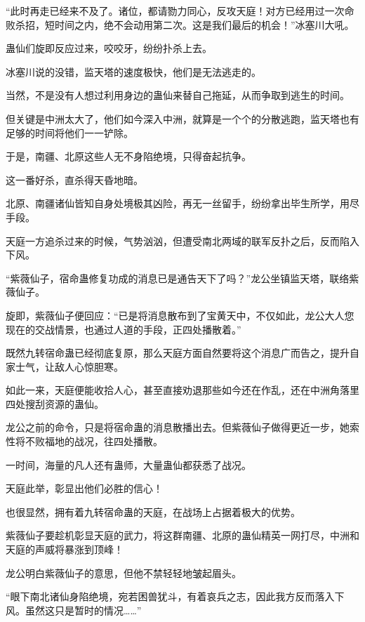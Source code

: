
\begin{this_body}

“此时再走已经来不及了。诸位，都请勠力同心，反攻天庭！对方已经用过一次命败杀招，短时间之内，绝不会动用第二次。这是我们最后的机会！”冰塞川大吼。

蛊仙们旋即反应过来，咬咬牙，纷纷扑杀上去。

冰塞川说的没错，监天塔的速度极快，他们是无法逃走的。

当然，不是没有人想过利用身边的蛊仙来替自己拖延，从而争取到逃生的时间。

但关键是中洲太大了，他们如今深入中洲，就算是一个个的分散逃跑，监天塔也有足够的时间将他们一一铲除。

于是，南疆、北原这些人无不身陷绝境，只得奋起抗争。

这一番好杀，直杀得天昏地暗。

北原、南疆诸仙皆知自身处境极其凶险，再无一丝留手，纷纷拿出毕生所学，用尽手段。

天庭一方追杀过来的时候，气势汹汹，但遭受南北两域的联军反扑之后，反而陷入下风。

“紫薇仙子，宿命蛊修复功成的消息已是通告天下了吗？”龙公坐镇监天塔，联络紫薇仙子。

旋即，紫薇仙子便回应：“已是将消息散布到了宝黄天中，不仅如此，龙公大人您现在的交战情景，也通过人道的手段，正四处播散着。”

既然九转宿命蛊已经彻底复原，那么天庭方面自然要将这个消息广而告之，提升自家士气，让敌人心惊胆寒。

如此一来，天庭便能收拾人心，甚至直接劝退那些如今还在作乱，还在中洲角落里四处搜刮资源的蛊仙。

龙公之前的命令，只是将宿命蛊的消息散播出去。但紫薇仙子做得更近一步，她索性将不败福地的战况，往四处播散。

一时间，海量的凡人还有蛊师，大量蛊仙都获悉了战况。

天庭此举，彰显出他们必胜的信心！

也很显然，拥有着九转宿命蛊的天庭，在战场上占据着极大的优势。

紫薇仙子要趁机彰显天庭的武力，将这群南疆、北原的蛊仙精英一网打尽，中洲和天庭的声威将暴涨到顶峰！

龙公明白紫薇仙子的意思，但他不禁轻轻地皱起眉头。

“眼下南北诸仙身陷绝境，宛若困兽犹斗，有着哀兵之志，因此我方反而落入下风。虽然这只是暂时的情况……”


\end{this_body}
